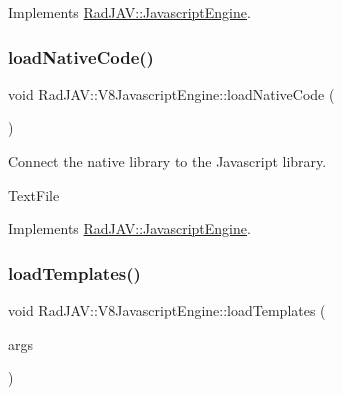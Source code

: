 Implements \mbox{\hyperlink{class_rad_j_a_v_1_1_javascript_engine_a4a720b2e36ab737ab0b697e9b7317fb0}{Rad\+J\+A\+V\+::\+Javascript\+Engine}}.

\mbox{\label{class_rad_j_a_v_1_1_v8_javascript_engine_afd8d4baa780d5ee7a77754eb5ca52e4d}} 
\subsubsection{\texorpdfstring{load\+Native\+Code()}{loadNativeCode()}}
{\footnotesize\ttfamily void Rad\+J\+A\+V\+::\+V8\+Javascript\+Engine\+::load\+Native\+Code (\begin{DoxyParamCaption}{ }\end{DoxyParamCaption})\hspace{0.3cm}{\ttfamily [virtual]}}



Connect the native library to the Javascript library. 

Text\+File 

Implements \mbox{\hyperlink{class_rad_j_a_v_1_1_javascript_engine_a91b208b07958c50ce906cd9f25eed669}{Rad\+J\+A\+V\+::\+Javascript\+Engine}}.

\mbox{\label{class_rad_j_a_v_1_1_v8_javascript_engine_aacc9572ce9cc0e4c9977fa588adfe5f6}} 
\subsubsection{\texorpdfstring{load\+Templates()}{loadTemplates()}}
{\footnotesize\ttfamily void Rad\+J\+A\+V\+::\+V8\+Javascript\+Engine\+::load\+Templates (\begin{DoxyParamCaption}\item[{const v8\+::\+Function\+Callback\+Info$<$ v8\+::\+Value $>$ \&}]{args }\end{DoxyParamCaption})\hspace{0.3cm}{\ttfamily [static]}}



